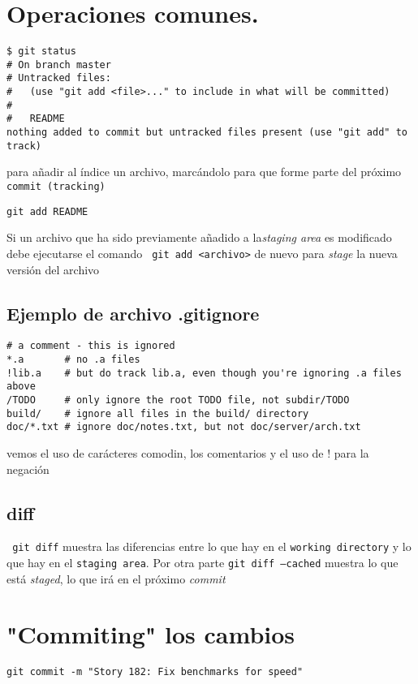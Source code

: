 \documentclass[]{article}
\title{}
\author{}
\begin{document}
\section*{Operaciones comunes.}
\begin{verbatim}
$ git status
# On branch master
# Untracked files:
#   (use "git add <file>..." to include in what will be committed)
#
#	README
nothing added to commit but untracked files present (use "git add" to track)
\end{verbatim}

para añadir al índice un archivo, marcándolo para que forme parte del próximo \texttt{commit (tracking)
}
\begin{verbatim}
git add README
\end{verbatim}

Si un archivo que ha sido previamente añadido a la\textit{staging area} es modificado debe ejecutarse el comando \verb= git add <archivo>= de nuevo para \textit{stage} la nueva versión del archivo 

\subsection*{Ejemplo de archivo .gitignore}
\begin{verbatim}
# a comment - this is ignored
*.a       # no .a files
!lib.a    # but do track lib.a, even though you're ignoring .a files above
/TODO     # only ignore the root TODO file, not subdir/TODO
build/    # ignore all files in the build/ directory
doc/*.txt # ignore doc/notes.txt, but not doc/server/arch.txt
\end{verbatim}

vemos el uso de carácteres comodin, los comentarios y el uso de ! para la negación

\subsection*{diff}

\verb= git diff= muestra las diferencias entre lo que hay en el \texttt{working directory} y lo que hay en el \texttt{staging area}. Por otra parte \texttt{git diff --cached} muestra lo que está \textit{staged}, lo que irá en el próximo \textit{commit} 

\section*{"Commiting" los cambios}


\verb=git commit -m "Story 182: Fix benchmarks for speed"=
\end{document}

